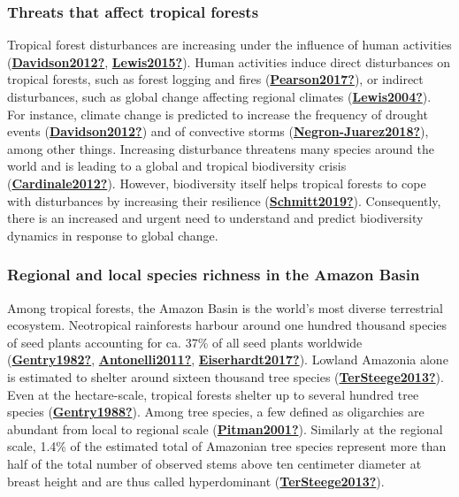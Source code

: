 \documentclass[12pt,twoside,a4paper, a]{article}
\begin{document}
\hypertarget{threats-that-affect-tropical-forests}{%
\subsubsection{Threats that affect tropical forests}\label{threats-that-affect-tropical-forests}}

Tropical forest disturbances are increasing under the influence of human activities (\protect\hyperlink{ref-Davidson2012}{\textbf{Davidson2012?}}, \protect\hyperlink{ref-Lewis2015}{\textbf{Lewis2015?}}).
Human activities induce direct disturbances on tropical forests, such as forest logging and fires (\protect\hyperlink{ref-Pearson2017}{\textbf{Pearson2017?}}),
or indirect disturbances, such as global change affecting regional climates (\protect\hyperlink{ref-Lewis2004}{\textbf{Lewis2004?}}).
For instance, climate change is predicted to increase the frequency of drought events (\protect\hyperlink{ref-Davidson2012}{\textbf{Davidson2012?}}) and of convective storms (\protect\hyperlink{ref-Negron-Juarez2018}{\textbf{Negron-Juarez2018?}}), among other things.
Increasing disturbance threatens many species around the world and is leading to a global and tropical biodiversity crisis (\protect\hyperlink{ref-Cardinale2012}{\textbf{Cardinale2012?}}).
However, biodiversity itself helps tropical forests to cope with disturbances by increasing their resilience (\protect\hyperlink{ref-Schmitt2019}{\textbf{Schmitt2019?}}).
Consequently, there is an increased and urgent need to understand and predict biodiversity dynamics in response to global change.

\hypertarget{regional-and-local-species-richness-in-the-amazon-basin}{%
\subsubsection{Regional and local species richness in the Amazon Basin}\label{regional-and-local-species-richness-in-the-amazon-basin}}

Among tropical forests, the Amazon Basin is the world's most diverse terrestrial ecosystem.
Neotropical rainforests harbour around one hundred thousand species of seed plants accounting for ca. 37\% of all seed plants worldwide (\protect\hyperlink{ref-Gentry1982}{\textbf{Gentry1982?}}, \protect\hyperlink{ref-Antonelli2011}{\textbf{Antonelli2011?}}, \protect\hyperlink{ref-Eiserhardt2017}{\textbf{Eiserhardt2017?}}).
Lowland Amazonia alone is estimated to shelter around sixteen thousand tree species (\protect\hyperlink{ref-TerSteege2013}{\textbf{TerSteege2013?}}).
Even at the hectare-scale, tropical forests shelter up to several hundred tree species (\protect\hyperlink{ref-Gentry1988}{\textbf{Gentry1988?}}).
Among tree species, a few defined as oligarchies are abundant from local to regional scale (\protect\hyperlink{ref-Pitman2001}{\textbf{Pitman2001?}}).
Similarly at the regional scale, 1.4\% of the estimated total of Amazonian tree species represent more than half of the total number of observed stems above ten centimeter diameter at breast height and are thus called hyperdominant (\protect\hyperlink{ref-TerSteege2013}{\textbf{TerSteege2013?}}).
\end{document}
